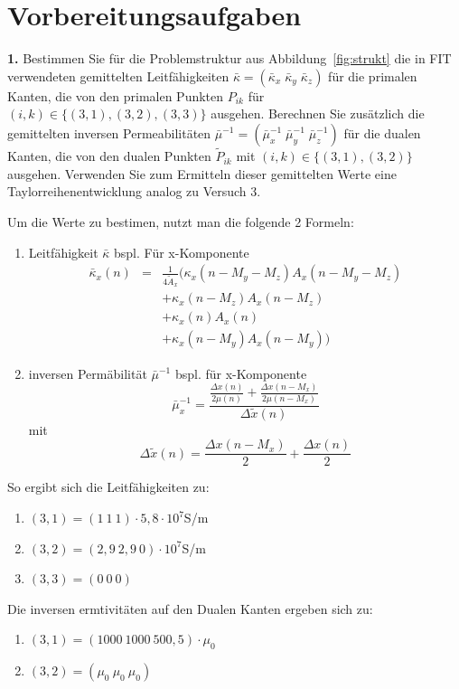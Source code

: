 \documentclass[Protokollheft.tex]{subfiles}
\begin{document}
\section{Vorbereitungsaufgaben}

\begin{framed}
	\noindent \textbf{1.} Bestimmen Sie für die Problemstruktur aus Abbildung~\ref{fig:strukt} die in FIT verwendeten
    gemittelten Leitfähigkeiten $\bar{\kappa}=(\bar{\kappa}_x\;\bar{\kappa}_y\;\bar{\kappa}_z)$ für die primalen Kanten, die von den primalen Punkten $P_{ik}$ für $(i,k)\in\{(3,1),(3,2),(3,3)\}$ ausgehen. Berechnen Sie zusätzlich die gemittelten inversen Permeabilitäten $\bar{\mu}^{-1}=(\bar{\mu}_x^{-1}\;\bar{\mu}_y^{-1}\;\bar{\mu}_z^{-1})$ für die dualen Kanten, die von den dualen Punkten $\widetilde{P}_{ik}$ mit $(i,k)\in\{(3,1),(3,2)\}$ ausgehen. Verwenden Sie zum Ermitteln dieser gemittelten Werte eine Taylorreihenentwicklung analog zu Versuch 3.\label{exer:averagedMaterials}
\end{framed}

Um die Werte zu bestimen, nutzt man die folgende 2 Formeln:
\begin{enumerate}
	\item Leitfähigkeit $\bar{\kappa}$
     bspl. Für x-Komponente
     \begin{eqnarray*} \bar{\kappa}_x(n)& = &\frac{1}{4\tilde{A}_x}(\kappa_x(n-M_y-M_z)A_x(n-M_y-M_z)\\
     &  &+\kappa_x(n-M_z)A_x(n-M_z)\\
     &    &+\kappa_x(n)A_x(n)\\
     &   &+\kappa_x(n-M_y)A_x(n-M_y))
    \end{eqnarray*}

 \item inversen Permäbilität $\bar{\mu}^{-1}$ bspl. für x-Komponente
$$\bar{\mu}_x^{-1}=\frac{\frac{\Delta x(n)}{2\mu(n)}+\frac{\Delta x(n-M_x)}{2\mu(n-M_x)}}{\Delta\tilde{x}(n)}$$ mit $$ \Delta\tilde{x}(n)=\frac{\Delta x(n-M_x)}{2}+\frac{\Delta x(n)}{2}$$
\end{enumerate}

So ergibt sich die Leitfähigkeiten zu:
\begin{enumerate}
	\item $(3,1) = (1\ 1\ 1) \cdot 5,8\cdot 10^7$S/m
	\item $(3,2) = (2,9\ 2,9\ 0)\cdot 10^7$S/m
	\item $(3,3) = (0\ 0\ 0)$
\end{enumerate}
Die inversen ermtivitäten auf den Dualen Kanten ergeben sich zu:
\begin{enumerate}
	\item $(3,1) = (1000\ 1000\ 500,5)\cdot \mu_0$
	\item $(3,2) = (\mu_0\ \mu_0\ \mu_0)$
\end{enumerate}
\end{document}

